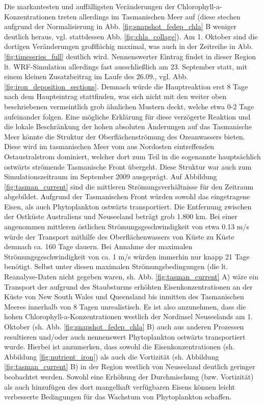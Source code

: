 \documentclass[12pt,a4paper,onecolumn,draft]{scrartcl}
\begin{document}
Die markantesten und auffälligsten Veränderungen der Chlorophyll-a-Konzentrationen treten allerdings im Tasmanischen Meer auf (diese stechen aufgrund der Normalisierung in Abb. \ref{fig:snapshot_fedep_chla} B weniger deutlich heraus, vgl. stattdessen Abb. \ref{fig:chla_collage}). Am 1. Oktober sind die dortigen Veränderungen großflächig maximal, was auch in der Zeitreihe in Abb. \ref{fig:timeseries_full} deutlich wird. Nennenswerter Eintrag findet in dieser Region lt. WRF-Simulation allerdings fast ausschließlich am 23. September statt, mit einem kleinen Zusatzbeitrag im Laufe des 26.09., vgl. Abb. \ref{fig:iron_deposition_sections}. Demnach würde die Hauptreaktion erst 8 Tage nach dem Haupteintrag stattfinden, was sich nicht mit den weiter oben beschriebenen vermeintlich grob ähnlichen Mustern deckt, welche etwa 0-2 Tage aufeinander folgen. Eine mögliche Erklärung für diese verzögerte Reaktion und die lokale Beschränkung
der hohen absoluten Änderungen auf das Tasmanische Meer könnte die Struktur der Oberflächenströmung des Ozeanwassers bieten. Diese wird im tasmanischen Meer vom aus Nordosten eintreffenden Ostaustralstrom dominiert, welcher dort zum Teil in die sogenannte hauptsächlich ostwärts strömende Tasmanische Front übergeht. Diese Struktur war auch zum Simulationszeitraum im September 2009 ausgeprägt. Auf Abbildung \ref{fig:tasman_current} sind die mittleren Strömungsverhältnisse für den Zeitraum abgebildet. Aufgrund der Tasmanischen Front würden sowohl das eingetragene Eisen, als auch Phytoplankton ostwärts transportiert. Die Entfernung zwischen der Ostküste Australiens und Neuseeland beträgt grob 1.800 km. Bei einer angenommen mittleren östlichen Strömungsgeschwindigkeit von etwa 0.13 m/s würde der Transport mithilfe des Oberflächenwassers von Küste zu Küste demnach ca. 160 Tage dauern. Bei Annahme der maximalen Strömungsgeschwindigkeit von ca. 1 m/s würden immerhin nur knapp 21 Tage benötigt. Selbst unter diesen maximalen Strömungsbedingungen (die lt. Reanalyse-Daten nicht gegeben waren, sh. Abb. \ref{fig:tasman_current} A) wäre ein Transport der aufgrund des Staubsturms erhöhten Eisenkonzentrationen an der Küste von New South Wales und Queensland bis inmitten des Tasmanischen Meeres innerhalb von 8 Tagen unrealistisch. Es ist also anzunehmen, dass die hohen Chlorophyll-a-Konzentrationen westlich der Nordinsel Neuseelands am 1. Oktober (sh. Abb. \ref{fig:snapshot_fedep_chla} B) auch aus anderen Prozessen resultieren und/oder auch nennenswert Phytoplankton ostwärts transportiert wurde. Hierbei ist anzumerken, dass sowohl die Eisenkonzentrationen (sh. Abbildung \ref{fig:nutrient_iron}) als auch die Vortizität (sh. Abbildung \ref{fig:tasman_current} B) in der Region westlich von Neuseeland deutlich geringer beobachtet werden. Sowohl eine Erhöhung der Durchmischung (bzw. Vortizität) als auch hinzufügen des dort mangelhaft verfügbaren Eisens können leicht verbesserte Bedingungen für das Wachstum von Phytoplankton schaffen. \\
\end{document}
